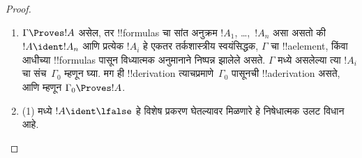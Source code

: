 \documentclass[../../../include/open-logic-section]{subfiles}
\begin{document}
\begin{proof}
  \begin{enumerate}
    \item $\Gamma \Proves !A$ असेल, तर !!{formula}s चा सांत अनुक्रम
      $!A_1$, \dots,~$!A_n$ असा असतो की $!A \ident !A_n$ आणि प्रत्येक
      $!A_i$ हे एकतर तर्कशास्त्रीय स्वयंसिद्धक, $\Gamma$ चा !!a{element},
      किंवा आधीच्या !!{formula}s पासून विध्यात्मक अनुमानाने निष्पन्न झालेले
      असते. $\Gamma$ मध्ये असलेल्या त्या $!A_i$ चा संच~$\Gamma_0$ म्हणून
      घ्या. मग ही !!{derivation} त्याचप्रमाणे~$\Gamma_0$ पासूनची
      !!a{derivation} असते, आणि म्हणून $\Gamma_0 \Proves !A$.
    \item (1) मध्ये $!A
      \ident \lfalse$ हे विशेष प्रकरण घेतल्यावर मिळणारे हे निषेधात्मक उलट
      विधान आहे.
\end{enumerate}
\end{proof}
\end{document}
